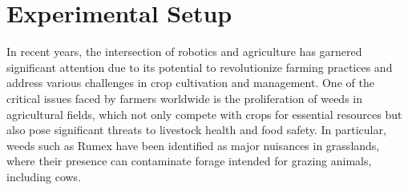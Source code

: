 \section{Experimental Setup}

In recent years, the intersection of robotics and agriculture has garnered significant attention due to its potential to revolutionize farming practices and address various challenges in crop cultivation and management. One of the critical issues faced by farmers worldwide is the proliferation of weeds in agricultural fields, which not only compete with crops for essential resources but also pose significant threats to livestock health and food safety. In particular, weeds such as Rumex have been identified as major nuisances in grasslands, where their presence can contaminate forage intended for grazing animals, including cows.

\vspace*{6mm}